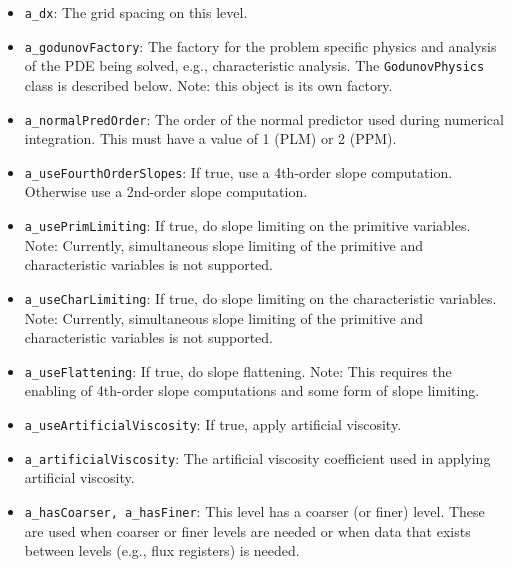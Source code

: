 \begin{itemize}
\begin{itemize}
\item \verb/a_dx/:  The grid spacing on this level.
\vspace{-0.07in}
\item \verb/a_godunovFactory/:  The factory for the problem specific physics
        and analysis of the PDE being solved, e.g., characteristic analysis.
        The \verb/GodunovPhysics/ class is described below.
        Note:  this object is its own factory.
\vspace{-0.07in}
\item \verb/a_normalPredOrder/:  The order of the normal predictor used
        during numerical integration.  This must have a value of 1 (PLM) or 2
        (PPM).
\vspace{-0.07in}
\item \verb/a_useFourthOrderSlopes/:  If true, use a 4th-order slope
        computation.  Otherwise use a 2nd-order slope computation.
\vspace{-0.07in}
\item \verb/a_usePrimLimiting/:  If true, do slope limiting on the primitive
        variables.  Note:  Currently, simultaneous slope limiting of the
        primitive and characteristic variables is not supported.
\vspace{-0.07in}
\item \verb/a_useCharLimiting/:  If true, do slope limiting on the
        characteristic variables.  Note:  Currently, simultaneous slope
        limiting of the primitive and characteristic variables is not
        supported.
\vspace{-0.07in}
\item \verb/a_useFlattening/:  If true, do slope flattening.  Note:  This
        requires the enabling of 4th-order slope computations and some form
        of slope limiting.
\vspace{-0.07in}
\item \verb/a_useArtificialViscosity/:  If true, apply artificial viscosity.
\vspace{-0.07in}
\item \verb/a_artificialViscosity/:  The artificial viscosity coefficient used
in applying artificial viscosity.
\vspace{-0.07in}
\item \verb/a_hasCoarser, a_hasFiner/:  This level has a coarser (or finer)
        level.  These are used when coarser or finer levels are
        needed or when data that exists between levels (e.g., flux registers)
        is needed.
\end{itemize}      


\end{itemize}
